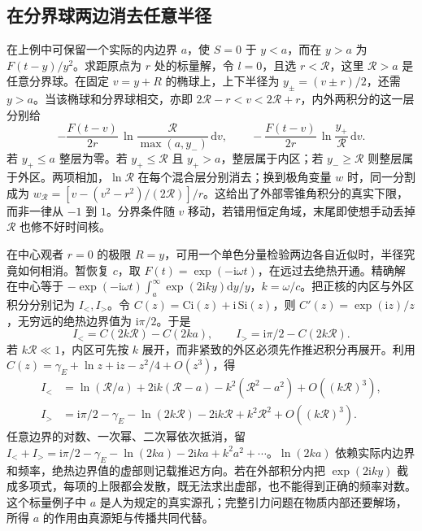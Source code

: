 \subsection{在分界球两边消去任意半径}

在上例中可保留一个实际的内边界 $a$，使 $S=0$ 于 $y<a$，而在 $y>a$ 为 $F(t-y)/y^2$。求距原点为 $r$ 处的标量解，令 $l=0$，且选 $r<\mathcal R$，这里 $\mathcal R>a$ 是任意分界球。在固定 $v=y+R$ 的椭球上，上下半径为 $y_\pm=(v\pm r)/2$，还需 $y>a$。当该椭球和分界球相交，亦即 $2\mathcal R-r<v<2\mathcal R+r$，内外两积分的这一层分别给
\[
 -\frac{F(t-v)}{2r}\,\ln\frac{\mathcal R}{\max(a,y_-)}\,\mathrm dv,\qquad
 -\frac{F(t-v)}{2r}\,\ln\frac{y_+}{\mathcal R}\,\mathrm dv .
\]
若 $y_+\le a$ 整层为零。若 $y_+\le\mathcal R$ 且 $y_+>a$，整层属于内区；若 $y_-\ge\mathcal R$ 则整层属于外区。两项相加，$\ln\mathcal R$ 在每个混合层分别消去；换到极角变量 $w$ 时，同一分割成为 $w_{\mathcal R}=[v-(v^2-r^2)/(2\mathcal R)]/r$。这给出了外部零锥角积分的真实下限，而非一律从 $-1$ 到 $1$。分界条件随 $v$ 移动，若错用恒定角域，末尾即使想手动丢掉 $\mathcal R$ 也修不好时间核。

在中心观者 $r=0$ 的极限 $R=y$，可用一个单色分量检验两边各自近似时，半径究竟如何相消。暂恢复 $c$，取 $F(t)=\exp(-\mathrm i\omega t)$，在远过去绝热开通。精确解在中心等于 $-\exp(-\mathrm i\omega t)\int_a^\infty \exp(2\mathrm iky)\mathrm dy/y$，$k=\omega/c$。把正核的内区与外区积分分别记为 $I_<,I_>$。令 $C(z)=\mathrm{Ci}(z)+\mathrm i\,\mathrm{Si}(z)$，则 $C'(z)=\exp(\mathrm iz)/z$，无穷远的绝热边界值为 $\mathrm i\pi/2$。于是
\[
 I_<=C(2k\mathcal R)-C(2ka),\qquad
 I_>=\mathrm i\pi/2-C(2k\mathcal R).
\]
若 $k\mathcal R\ll1$，内区可先按 $k$ 展开，而非紧致的外区必须先作推迟积分再展开。利用 $C(z)=\gamma_E+\ln z+\mathrm iz-z^2/4+O(z^3)$，得
\begin{align*}
 I_< &=\ln(\mathcal R/a)+2\mathrm ik(\mathcal R-a)
                      -k^2(\mathcal R^2-a^2)+O((k\mathcal R)^3),\\
 I_> &=\mathrm i\pi/2-\gamma_E-\ln(2k\mathcal R)
                      -2\mathrm ik\mathcal R+k^2\mathcal R^2+O((k\mathcal R)^3).
\end{align*}
任意边界的对数、一次幂、二次幂依次抵消，留 $I_<+I_>=\mathrm i\pi/2-\gamma_E-\ln(2ka)-2\mathrm ika+k^2a^2+\cdots$。$\ln(2ka)$ 依赖实际内边界和频率，绝热边界值的虚部则记载推迟方向。若在外部积分内把 $\exp(2\mathrm iky)$ 截成多项式，每项的上限都会发散，既无法求出虚部，也不能得到正确的频率对数。这个标量例子中 $a$ 是人为规定的真实源孔；完整引力问题在物质内部还要解场，所得 $a$ 的作用由真源矩与传播共同代替。

